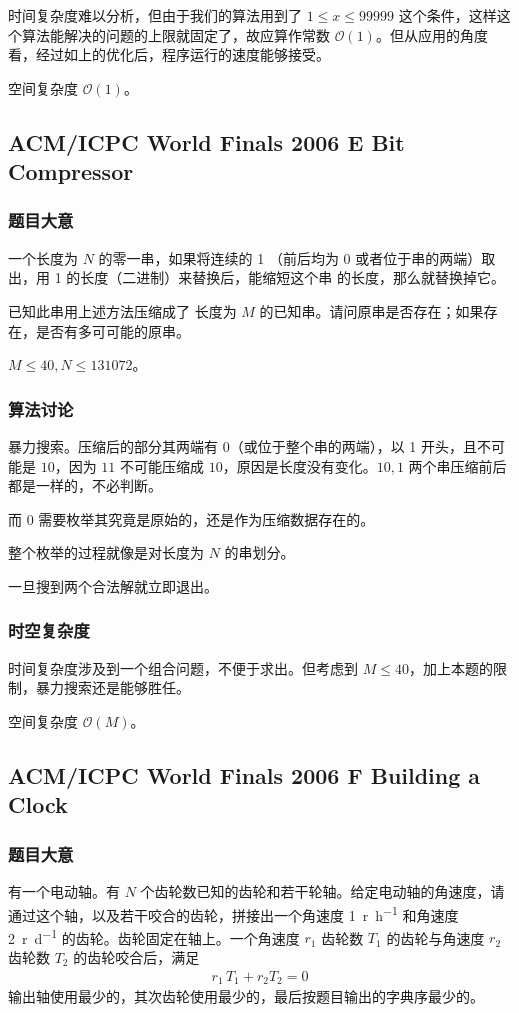 				时间复杂度难以分析，但由于我们的算法用到了 $1 \le x \le \num{99999}$ 这个条件，这样这个算法能解决的问题的上限就固定了，故应算作常数 $\mathcal{O}\left(1\right)$。但从应用的角度看，经过如上的优化后，程序运行的速度能够接受。
					
				空间复杂度 $\mathcal{O}\left(1\right)$。
			
		\newpage
		\subsection{ACM/ICPC World Finals 2006 E Bit Compressor}
			\subsubsection{题目大意}
				一个长度为 $N$ 的零一串，如果将连续的 1 （前后均为 0 或者位于串的两端）取出，用 1 的长度（二进制）来替换后，能缩短这个串 的长度，那么就替换掉它。
				
				已知此串用上述方法压缩成了 长度为 $M$ 的已知串。请问原串是否存在；如果存在，是否有多可可能的原串。
				
				$M \le 40, N \le \num{131072}$。
			\subsubsection{算法讨论}
				暴力搜索。压缩后的部分其两端有 0（或位于整个串的两端），以 1 开头，且不可能是 $10$，因为 $11$ 不可能压缩成 $10$，原因是长度没有变化。$10, 1$ 两个串压缩前后都是一样的，不必判断。
				
				而 0 需要枚举其究竟是原始的，还是作为压缩数据存在的。
				
				整个枚举的过程就像是对长度为 $N$ 的串划分。
				
				一旦搜到两个合法解就立即退出。
			\subsubsection{时空复杂度}
				时间复杂度涉及到一个组合问题，不便于求出。但考虑到 $M \le 40$，加上本题的限制，暴力搜索还是能够胜任。
				
				空间复杂度 $\mathcal{O}\left(M\right)$。

		\newpage
		\subsection{ACM/ICPC World Finals 2006 F Building a Clock}
			\subsubsection{题目大意}
				有一个电动轴。有 $N$ 个齿轮数已知的齿轮和若干轮轴。给定电动轴的角速度，请通过这个轴，以及若干咬合的齿轮，拼接出一个角速度 \SI{1}{r\per\hour} 和角速度 \SI{2}{r\per\day}  的齿轮。齿轮固定在轴上。一个角速度 $r_1$ 齿轮数 $T_1$ 的齿轮与角速度 $r_2$ 齿轮数 $T_2$ 的齿轮咬合后，满足
				\begin{align}
					r_1\,T_1 + r_2T_2 = 0\label{2006f}
				\end{align}
				输出轴使用最少的，其次齿轮使用最少的，最后按题目输出的字典序最少的。
				
